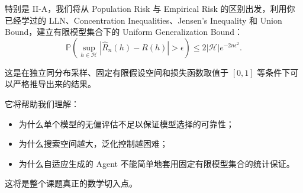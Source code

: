 特别是 II-A，我们将从 Population Risk 与 Empirical Risk 的区别出发，利用你已经学过的 LLN、Concentration Inequalities、Jensen's Inequality 和 Union Bound，建立有限模型集合下的 Uniform Generalization Bound：
\[\mathbb P\left(
\sup_{h\in\mathcal H}
|\widehat R_n(h)-R(h)|
>\epsilon
\right)
\leq
2|\mathcal H|e^{-2n\epsilon^2}.\]

这是在独立同分布采样、固定有限假设空间和损失函数取值于 \([0,1]\) 等条件下可以严格推导出来的结果。

它将帮助我们理解：

\begin{itemize}
\tightlist
\item
  为什么单个模型的无偏评估不足以保证模型选择的可靠性；
\item
  为什么搜索空间越大，泛化控制越困难；
\item
  为什么自适应生成的 Agent 不能简单地套用固定有限模型集合的统计保证。
\end{itemize}

这将是整个课题真正的数学切入点。
